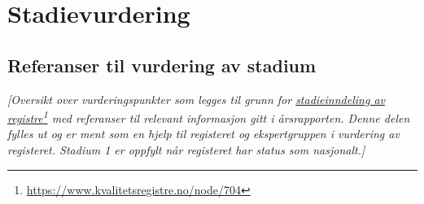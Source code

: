 \documentclass[norsk, a4paper, twocolumn]{report}
\newcommand{\guide}[1] {
	\textit{[\textcolor{guidegray}{#1}]}
	}
\begin{document}
\part{Stadievurdering}


\chapter{Referanser til vurdering av stadium}
\guide{Oversikt over vurderingspunkter som legges til grunn for
\href{https://www.kvalitetsregistre.no/node/704}{stadieinndeling av registre}\footnote{\url{https://www.kvalitetsregistre.no/node/704}}
med referanser til relevant informasjon
gitt i årsrapporten. Denne delen fylles ut og er ment som en
hjelp til registeret og ekspertgruppen i vurdering av registeret. Stadium 1
er oppfylt når registeret har status som nasjonalt.}

\bigskip
\bigskip
\end{document}
